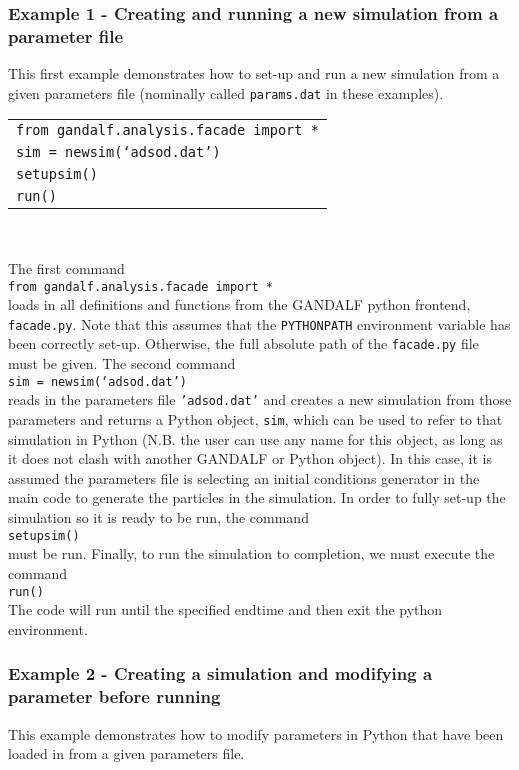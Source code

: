 \documentclass[a4paper]{article}
\newcommand{\var}[1]{\texttt{#1}}
\newcommand{\singlecommand}[1]{\\ \newline \indent \var{#1} \\ \newline \noindent}
\begin{document}
\subsubsection{Example 1 - Creating and running a new simulation from a parameter file}
This first example demonstrates how to set-up and run a new simulation from a given parameters file (nominally called \var{params.dat} in these examples).  \\

\begin{tabular}{p{14.0cm}}
\var{from gandalf.analysis.facade import *} \\
\var{sim = newsim(`adsod.dat')}            \\
\var{setupsim()} \\
\var{run()} \\
\end{tabular} \\
\newline

\noindent The first command \singlecommand{from gandalf.analysis.facade import *} loads in all definitions and functions from the GANDALF python frontend, \var{facade.py}.  Note that this assumes that the \var{PYTHONPATH} environment variable has been correctly set-up.  Otherwise, the full absolute path of the \var{facade.py} file must be given.  The second command \singlecommand{sim = newsim(`adsod.dat')} reads in the parameters file \var{'adsod.dat'} and creates a new simulation from those parameters and returns a Python object, \var{sim}, which can be used to refer to that simulation in Python (N.B. the user can use any name for this object, as long as it does not clash with another GANDALF or Python object).  In this case, it is assumed the parameters file is selecting an initial conditions generator in the main code to generate the particles in the simulation.  In order to fully set-up the simulation so it is ready to be run, the command \singlecommand{setupsim()} must be run.  Finally, to run the simulation to completion, we must execute the command \singlecommand{run()}  The code will run until the specified endtime and then exit the python environment.
\newpage


\subsubsection{Example 2 - Creating a simulation and modifying a parameter before running}
This example demonstrates how to modify parameters in Python that have been loaded in from a given parameters file. \\
\end{document}
